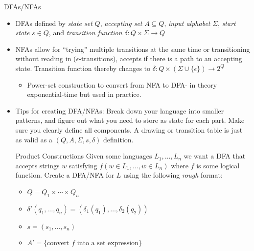 \documentclass{beamer}
\begin{document}
\begin{frame}[t]{DFAs/NFAs}
    \begin{itemize}
        \item DFAs defined by \textit{state set} $Q$, \textit{accepting set} $A \subseteq Q$, \textit{input alphabet} $\Sigma$, \textit{start state} $s \in Q$, and \textit{transition function} $\delta: Q \times\Sigma \rightarrow Q$
        \item NFAs allow for ``trying'' multiple transitions at the same time or transitioning without reading in ($\epsilon$-transitions), accepts if there is a path to an accepting state. Transition function thereby changes to $\delta: Q \times(\Sigma \cup\{\epsilon\}) \rightarrow 2^Q$
        \begin{itemize}
            \item Power-set construction to convert from NFA to DFA- in theory exponential-time but used in practice.
        \end{itemize}
        \item \alert{Tips for creating DFA/NFAs}: Break down your language into smaller patterns, and figure out what you need to store as state for each part. Make sure you clearly define all components. A drawing or transition table is just as valid as a $(Q,A,\Sigma, s, \delta)$ definition. \pause
        \begin{block}{Product Constructions}
            Given some languages $L_1, \dots, L_n$ we want a DFA that accepts strings $w$ satisfying $f(w \in L_1,\dots,w \in L_n)$ where $f$ is some logical function. Create a DFA/NFA for $L$ using the following \textit{rough} format:
            \begin{itemize}
                \item $Q = Q_1 \times \cdots \times Q_n$
                \item $\delta'(q_1,\dots,q_n) = (\delta_1(q_1),\dots,\delta_2(q_2))$
                \item $s = (s_1,\dots,s_n)$
                \item $A' = \{\text{convert $f$ into a set expression}\}$
            \end{itemize}
        \end{block}
    \end{itemize}
\end{frame}
\end{document}
